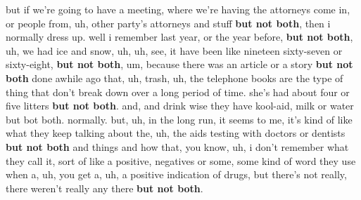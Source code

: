 \documentclass[11pt,letterpaper]{article}
\begin{document}
\begin{exe}
\begin{xlist}
	\ex but if we're going to have a meeting, where we're having the attorneys come in, or people from, uh, other party's attorneys and stuff \textbf{but not both}, then i normally dress up.
	\ex well i remember last year, or the year before, \textbf{but not both}, uh, we had ice and snow, uh, uh,
	\ex see, it have been like nineteen sixty-seven or sixty-eight, \textbf{but not both}, um,
	\ex because there was an article or a story \textbf{but not both} done awhile ago that, uh, trash, uh, the telephone books are the type of thing that don't break down over a long period of time.
	\ex she's had about four or five litters \textbf{but not both}.
	\ex and, and drink wise they have kool-aid, milk or water but bot both. normally.
	\ex but, uh, in the long run, it seems to me, it's kind of like what they keep talking about the, uh, the aids testing with doctors or dentists \textbf{but not both} and things and how that, you know,
	\ex uh, i don't remember what they call it, sort of like a positive, negatives or some, some kind of word they use when a, uh, you get a, uh, a positive indication of drugs, but there's not really, there weren't really any there \textbf{but not both}.
	\end{xlist}
\end{exe}



\setlength{\bibleftmargin}{.125in}
\setlength{\bibindent}{-\bibleftmargin}


\end{document}
